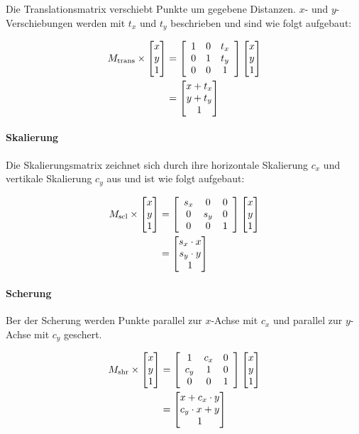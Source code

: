 Die Translationsmatrix verschiebt Punkte um gegebene Distanzen. $x$- und $y$-Verschiebungen werden mit $t_x$ und $t_y$ beschrieben und sind wie folgt aufgebaut:

\begin{align*}
    M_\text{trans} \times \begin{bmatrix} x \\ y \\ 1 \\ \end{bmatrix}
     & =
    \left[
        \begin{array}{ccc}
            1 & 0 & t_x \\
            0 & 1 & t_y \\
            0 & 0 & 1   \\
        \end{array}
        \right]
    \begin{bmatrix} x \\ y \\ 1 \\ \end{bmatrix}             \\
     & =
    \begin{bmatrix} x + t_x \\ y + t_y \\ 1 \\ \end{bmatrix} \\
\end{align*}

\paragraph{Skalierung}
\label{par:skalierung}

Die Skalierungsmatrix zeichnet sich durch ihre horizontale Skalierung $c_x$ und vertikale Skalierung $c_y$ aus und ist wie folgt aufgebaut:

\begin{align*}
    M_\text{scl} \times \begin{bmatrix} x \\ y \\ 1 \\ \end{bmatrix}
     & =
    \left[
        \begin{array}{ccc}
            s_x & 0   & 0 \\
            0   & s_y & 0 \\
            0   & 0   & 1 \\
        \end{array}
        \right]
    \begin{bmatrix} x \\ y \\ 1 \\ \end{bmatrix}                     \\
     & =
    \begin{bmatrix} s_x \cdot x \\ s_y \cdot y \\ 1 \\ \end{bmatrix} \\
\end{align*}

\paragraph{Scherung}
\label{par:scherung}

Ber der Scherung werden Punkte parallel zur $x$-Achse mit $c_x$ und parallel zur $y$-Achse mit $c_y$ geschert.

\begin{align*}
    M_\text{shr} \times \begin{bmatrix} x \\ y \\ 1 \\ \end{bmatrix}
     & =
    \left[
        \begin{array}{ccc}
            1   & c_x & 0 \\
            c_y & 1   & 0 \\
            0   & 0   & 1 \\
        \end{array}
        \right]
    \begin{bmatrix} x \\ y \\ 1 \\ \end{bmatrix}                             \\
     & =
    \begin{bmatrix} x + c_x \cdot y \\ c_y \cdot x + y \\ 1 \\ \end{bmatrix} \\
\end{align*}

